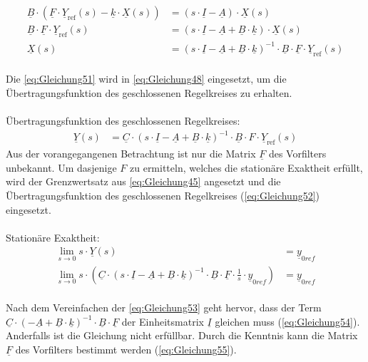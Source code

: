 \documentclass[
	pagesize,
	fontsize=12pt,
	paper=a4,
	oneside,
   reqno
]{scrartcl}
\begin{document}
\begin{align}
    \underline{B}\cdot(\underline{F}\cdot\underline{Y}_{\mathrm{ref}}(s)-\underline{k}\cdot\underline{X}(s)) &= (s\cdot\underline{I}-\underline{A})\cdot\underline{X}(s) \nonumber \\
    \underline{B}\cdot \underline{F}\cdot\underline{Y}_{\mathrm{ref}}(s) &= (s\cdot\underline{I}-\underline{A}+\underline{B}\cdot{\underline{k}})\cdot\underline{X}(s) \nonumber \\
    \underline{X}(s) &= (s\cdot\underline{I}-\underline{A}+\underline{B}\cdot{\underline{k}})^{-1}\cdot\underline{B}\cdot \underline{F}\cdot\underline{Y}_{\mathrm{ref}}(s) \label{eq:Gleichung51}
\end{align}\\
Die \autoref{eq:Gleichung51} wird in \autoref{eq:Gleichung48} eingesetzt, um die Übertragungsfunktion des geschlossenen Regelkreises zu erhalten.\\\\
Übertragungsfunktion des geschlossenen Regelkreises:
\begin{align}
        \underline{Y}(s) &= \underline{C}\cdot(s\cdot\underline{I}-\underline{A}+\underline{B}\cdot{\underline{k}})^{-1}\cdot\underline{B}\cdot F\cdot\underline{Y}_{\mathrm{ref}}(s) \label{eq:Gleichung52}
\end{align}
Aus der vorangegangenen Betrachtung ist nur die Matrix $\underline{F}$ des Vorfilters unbekannt. Um dasjenige $F$ zu ermitteln, welches die stationäre Exaktheit erfüllt, wird der Grenzwertsatz aus \autoref{eq:Gleichung45} angesetzt und die Übertragungsfunktion des geschlossenen Regelkreises (\autoref{eq:Gleichung52}) eingesetzt.\\\\
Stationäre Exaktheit:
\begin{align}
    \lim_{s \to 0} s\cdot \underline{Y}(s) &= \underline{y}_{0ref} \nonumber \\
    \lim_{s \to 0} s\cdot (\underline{C}\cdot(s\cdot\underline{I}-\underline{A}+\underline{B}\cdot{\underline{k}})^{-1}\cdot\underline{B}\cdot\underline{F}\cdot\frac{1}{s}\cdot\underline{y}_{0ref}) &= \underline{y}_{0ref} \label{eq:Gleichung53}
\end{align}\\
Nach dem Vereinfachen der \autoref{eq:Gleichung53} geht hervor, dass der Term $\underline{C}\cdot(-\underline{A}+\underline{B}\cdot{\underline{k}})^{-1}\cdot\underline{B}\cdot\underline{F}$ der Einheitsmatrix $\underline{I}$ gleichen muss (\autoref{eq:Gleichung54}). Anderfalls ist die Gleichung nicht erfüllbar. Durch die Kenntnis kann die Matrix $\underline{F}$ des Vorfilters bestimmt werden (\autoref{eq:Gleichung55}).\\\\
\end{document}
